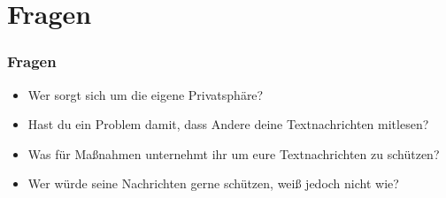 \section*{Fragen}

\begin{frame}
  \frametitle{Fragen}

  \begin{itemize}
   \item Wer sorgt sich um die eigene Privatsphäre?
   \pause
   \item Hast du ein Problem damit, dass Andere deine Textnachrichten mitlesen?
   \pause
   \item Was für Maßnahmen unternehmt ihr um eure Textnachrichten zu schützen?
   \pause
   \item Wer würde seine Nachrichten gerne schützen, weiß jedoch nicht wie?
  \end{itemize}
\end{frame}

